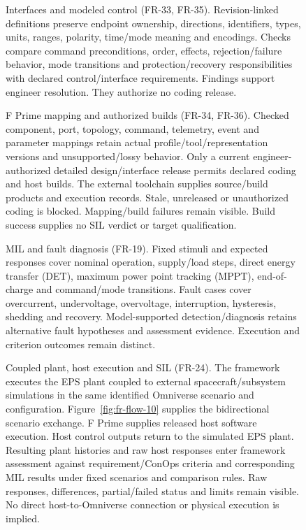 \begin{figure}[H]
\centering
{}
\caption[Interfaces and modeled control.]{Interfaces and modeled control (FR-33, FR-35). Revision-linked definitions preserve endpoint ownership, directions, identifiers, types, units, ranges, polarity, time/mode meaning and encodings. Checks compare command preconditions, order, effects, rejection/failure behavior, mode transitions and protection/recovery responsibilities with declared control/interface requirements. Findings support engineer resolution. They authorize no coding release.}
\label{fig:fr-flow-16}
\end{figure}
\clearpage

\begin{figure}[H]
\centering
{}
\caption[F Prime mapping and authorized builds.]{F Prime mapping and authorized builds (FR-34, FR-36). Checked component, port, topology, command, telemetry, event and parameter mappings retain actual profile/tool/representation versions and unsupported/lossy behavior. Only a current engineer-authorized detailed design/interface release permits declared coding and host builds. The external toolchain supplies source/build products and execution records. Stale, unreleased or unauthorized coding is blocked. Mapping/build failures remain visible. Build success supplies no SIL verdict or target qualification.}
\label{fig:fr-flow-17}
\end{figure}
\clearpage

\begin{figure}[H]
\centering
{}
\caption[MIL and fault diagnosis.]{MIL and fault diagnosis (FR-19). Fixed stimuli and expected responses cover nominal operation, supply/load steps, direct energy transfer (DET), maximum power point tracking (MPPT), end-of-charge and command/mode transitions. Fault cases cover overcurrent, undervoltage, overvoltage, interruption, hysteresis, shedding and recovery. Model-supported detection/diagnosis retains alternative fault hypotheses and assessment evidence. Execution and criterion outcomes remain distinct.}
\label{fig:fr-flow-18}
\end{figure}
\clearpage

\begin{figure}[H]
\centering
{}
\caption[Coupled plant, host execution and SIL.]{Coupled plant, host execution and SIL (FR-24). The framework executes the EPS plant coupled to external spacecraft/subsystem simulations in the same identified Omniverse scenario and configuration. Figure~\ref{fig:fr-flow-10} supplies the bidirectional scenario exchange. F Prime supplies released host software execution. Host control outputs return to the simulated EPS plant. Resulting plant histories and raw host responses enter framework assessment against requirement/ConOps criteria and corresponding MIL results under fixed scenarios and comparison rules. Raw responses, differences, partial/failed status and limits remain visible. No direct host-to-Omniverse connection or physical execution is implied.}
\label{fig:fr-flow-19}
\end{figure}
\clearpage

